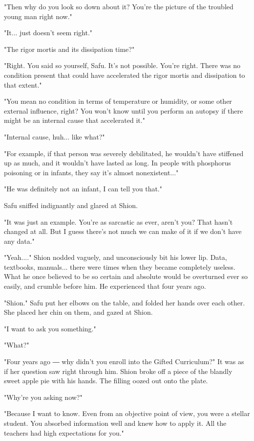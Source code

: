 "Then why do you look so down about it? You're the picture of the
troubled young man right now."

"It... just doesn't seem right."

"The rigor mortis and its dissipation time?"

"Right. You said so yourself, Safu. It's not possible. You're right.
There was no condition present that could have accelerated the rigor
mortis and dissipation to that extent."

"You mean no condition in terms of temperature or humidity, or some
other external influence, right? You won't know until you perform an
autopsy if there might be an internal cause that accelerated it."

"Internal cause, huh... like what?"

"For example, if that person was severely debilitated, he wouldn't have
stiffened up as much, and it wouldn't have lasted as long. In people
with phosphorus poisoning or in infants, they say it's almost
nonexistent..."

"He was definitely not an infant, I can tell you that."

Safu sniffed indignantly and glared at Shion.

"It was just an example. You're as sarcastic as ever, aren't you? That
hasn't changed at all. But I guess there's not much we can make of it if
we don't have any data."

"Yeah...." Shion nodded vaguely, and unconsciously bit his lower lip.
Data, textbooks, manuals... there were times when they became completely
useless. What he once believed to be so certain and absolute would be
overturned ever so easily, and crumble before him. He experienced that
four years ago.

\mybreak

"Shion." Safu put her elbows on the table, and folded her hands over
each other. She placed her chin on them, and gazed at Shion.

"I want to ask you something."

"What?"

"Four years ago ― why didn't you enroll into the Gifted Curriculum?" It
was as if her question saw right through him. Shion broke off a piece of
the blandly sweet apple pie with his hands. The filling oozed out onto
the plate.

\myspace

"Why're you asking now?"

"Because I want to know. Even from an objective point of view, you were
a stellar student. You absorbed information well and knew how to apply
it. All the teachers had high expectations for you."

